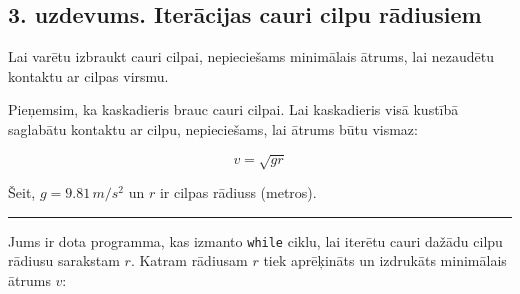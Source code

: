 \begin{Shaded}
\begin{Highlighting}[]
\OperatorTok{=}    
\OperatorTok{=}    
\OperatorTok{=} \NormalTok{,} 
\OperatorTok{=}  \OperatorTok{/} \OperatorTok{{-}}\OperatorTok{\^{}}\OperatorTok{/}\OperatorTok{\^{}}\NormalTok{) )}
\OperatorTok{=}\OperatorTok{*}\OperatorTok{*}
\end{Highlighting}
\end{Shaded}

\subsection{3. uzdevums. Iterācijas cauri cilpu
rādiusiem}\label{uzdevums.-iterux101cijas-cauri-cilpu-rux101diusiem}

Lai varētu izbraukt cauri cilpai, nepieciešams minimālais ātrums, lai
nezaudētu kontaktu ar cilpas virsmu.

Pieņemsim, ka kaskadieris brauc cauri cilpai. Lai kaskadieris visā
kustībā saglabātu kontaktu ar cilpu, nepieciešams, lai ātrums būtu
vismaz:

\[
v = \sqrt{g r}
\]

Šeit, \(g = 9.81 \, m/s^2\) un \(r\) ir cilpas rādiuss (metros).

\begin{center}\rule{0.5\linewidth}{0.5pt}\end{center}

Jums ir dota programma, kas izmanto \texttt{while} ciklu, lai iterētu
cauri dažādu cilpu rādiusu sarakstam \(r\). Katram rādiusam \(r\) tiek
aprēķināts un izdrukāts minimālais ātrums \(v\):

